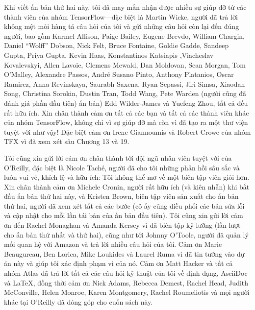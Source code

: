 Khi viết ấn bản thứ hai này, tôi đã may mắn nhận được nhiều sự giúp đỡ từ các thành viên của nhóm TensorFlow—đặc biệt là Martin Wicke, người đã trả lời không mệt mỏi hàng tá câu hỏi của tôi và gửi những câu hỏi còn lại đến đúng người, bao gồm Karmel Allison, Paige Bailey, Eugene Brevdo, William Chargin, Daniel “Wolff” Dobson, Nick Felt, Bruce Fontaine, Goldie Gadde, Sandeep Gupta, Priya Gupta, Kevin Haas, Konstantinos Katsiapis ,Viacheslav Kovalevskyi, Allen Lavoie, Clemens Mewald, Dan Moldovan, Sean Morgan, Tom O'Malley, Alexandre Passos, André Susano Pinto, Anthony Platanios, Oscar Ramirez, Anna Revinskaya, Saurabh Saxena, Ryan Sepassi, Jiri Simsa, Xiaodan Song, Christina Sorokin, Dustin Tran, Todd Wang, Pete Warden (người cũng đã đánh giá phần đầu tiên) ấn bản) Edd Wilder-James và Yuefeng Zhou, tất cả đều rất hữu ích. Xin chân thành cảm ơn tất cả các bạn và tất cả các thành viên khác của nhóm TensorFlow, không chỉ vì sự giúp đỡ mà còn vì đã tạo ra một thư viện tuyệt vời như vậy! Đặc biệt cảm ơn Irene Giannoumis và Robert Crowe của nhóm TFX vì đã xem xét sâu Chương 13 và 19.

Tôi cũng xin gửi lời cảm ơn chân thành tới đội ngũ nhân viên tuyệt vời của O’Reilly, đặc biệt là Nicole Taché, người đã cho tôi những phản hồi sâu sắc và luôn vui vẻ, khích lệ và hữu ích: Tôi không thể mơ về một biên tập viên giỏi hơn. Xin chân thành cảm ơn Michele Cronin, người rất hữu ích (và kiên nhẫn) khi bắt đầu ấn bản thứ hai này, và Kristen Brown, biên tập viên sản xuất cho ấn bản thứ hai, người đã xem xét tất cả các bước (cô ấy cũng điều phối các bản sửa lỗi và cập nhật cho mỗi lần tái bản của ấn bản đầu tiên). Tôi cũng xin gửi lời cảm ơn đến Rachel Monaghan và Amanda Kersey vì đã biên tập kỹ lưỡng (lần lượt cho ấn bản thứ nhất và thứ hai), cũng như tới Johnny O’Toole, người đã quản lý mối quan hệ với Amazon và trả lời nhiều câu hỏi của tôi. Cảm ơn Marie Beaugureau, Ben Lorica, Mike Loukides và Laurel Ruma vì đã tin tưởng vào dự án này và giúp tôi xác định phạm vi của nó. Cảm ơn Matt Hacker và tất cả nhóm Atlas đã trả lời tất cả các câu hỏi kỹ thuật của tôi về định dạng, AsciiDoc và LaTeX, đồng thời cảm ơn Nick Adams, Rebecca Demest, Rachel Head, Judith McConville, Helen Monroe, Karen Montgomery, Rachel Roumeliotis và mọi người khác tại O'Reilly đã đóng góp cho cuốn sách này.

